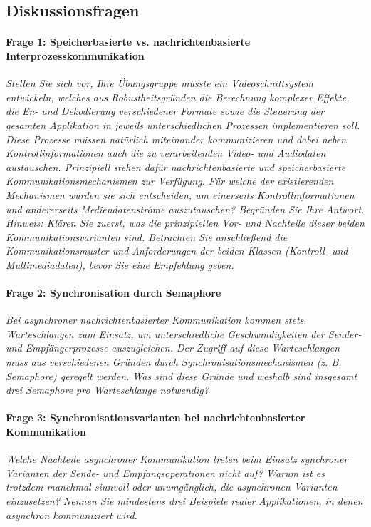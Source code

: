 \documentclass[a4paper]{article}
\begin{document}
\subsection{Diskussionsfragen}
\paragraph{Frage 1: Speicherbasierte vs. nachrichtenbasierte Interprozesskommunikation}
\textit{Stellen Sie sich vor, Ihre Übungsgruppe müsste ein Videoschnittsystem entwickeln, welches aus Robustheitsgründen die Berechnung komplexer Effekte, die En- und Dekodierung verschiedener Formate sowie die Steuerung der gesamten Applikation in jeweils unterschiedlichen Prozessen implementieren soll. Diese Prozesse müssen natürlich miteinander kommunizieren und dabei neben Kontrollinformationen auch die zu verarbeitenden Video- und Audiodaten austauschen.
    Prinzipiell stehen dafür nachrichtenbasierte und speicherbasierte Kommunikationsmechanismen zur Verfügung. Für welche der existierenden Mechanismen würden sie sich entscheiden, um einerseits Kontrollinformationen und andererseits Mediendatenströme auszutauschen? Begründen Sie Ihre Antwort.\\
    Hinweis: Klären Sie zuerst, was die prinzipiellen Vor- und Nachteile dieser beiden Kommunikationsvarianten sind. Betrachten Sie anschließend die Kommunikationsmuster und Anforderungen der beiden Klassen (Kontroll- und Multimediadaten), bevor Sie eine Empfehlung geben.
}

\vspace{10mm}
\paragraph{Frage 2: Synchronisation durch Semaphore}
\textit{Bei asynchroner nachrichtenbasierter Kommunikation kommen stets Warteschlangen zum Einsatz, um unterschiedliche Geschwindigkeiten der Sender- und Empfängerprozesse auszugleichen. Der Zugriff auf diese Warteschlangen muss aus verschiedenen Gründen durch Synchronisationsmechanismen (z. B. Semaphore) geregelt werden. Was sind diese Gründe und weshalb sind insgesamt drei Semaphore pro Warteschlange notwendig?}

\vspace{10mm}
\paragraph{Frage 3: Synchronisationsvarianten bei nachrichtenbasierter Kommunikation}
\textit{Welche Nachteile asynchroner Kommunikation treten beim Einsatz synchroner Varianten der Sende- und Empfangsoperationen nicht auf? Warum ist es trotzdem manchmal sinnvoll oder unumgänglich, die asynchronen Varianten einzusetzen? Nennen Sie mindestens drei Beispiele realer Applikationen, in denen asynchron kommuniziert wird.}
\end{document}
